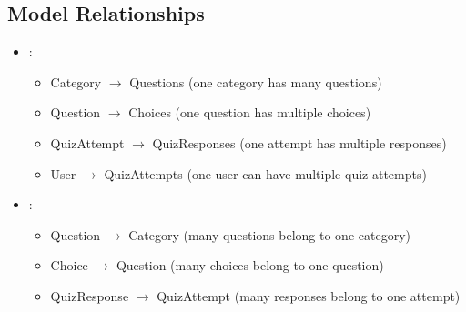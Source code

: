 \documentclass[letterpaper,10pt,english]{sphinxmanual}
\begin{document}
\subsection{Model Relationships}
\label{\detokenize{models:model-relationships}}\begin{itemize}
\item {} 
\sphinxAtStartPar
{}:
\begin{itemize}
\item {} 
\sphinxAtStartPar
Category \(\rightarrow\) Questions (one category has many questions)

\item {} 
\sphinxAtStartPar
Question \(\rightarrow\) Choices (one question has multiple choices)

\item {} 
\sphinxAtStartPar
QuizAttempt \(\rightarrow\) QuizResponses (one attempt has multiple responses)

\item {} 
\sphinxAtStartPar
User \(\rightarrow\) QuizAttempts (one user can have multiple quiz attempts)

\end{itemize}

\item {} 
\sphinxAtStartPar
{}:
\begin{itemize}
\item {} 
\sphinxAtStartPar
Question \(\rightarrow\) Category (many questions belong to one category)

\item {} 
\sphinxAtStartPar
Choice \(\rightarrow\) Question (many choices belong to one question)

\item {} 
\sphinxAtStartPar
QuizResponse \(\rightarrow\) QuizAttempt (many responses belong to one attempt)

\end{itemize}

\end{itemize}
\end{document}
